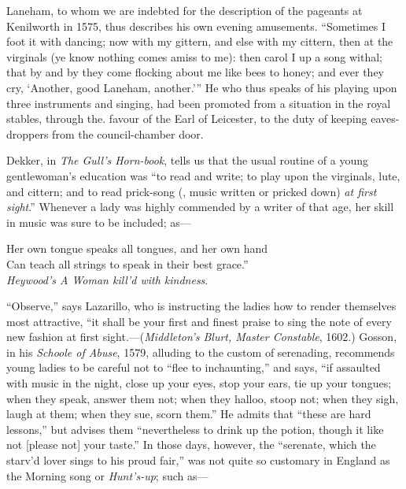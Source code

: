 
Laneham, to whom we are indebted for the description of the pageants at Kenilworth
in 1575, thus describes his own evening amusements. “Sometimes I foot
it with dancing; now with my gittern, and else with my cittern, then at the
virginals (ye know nothing comes amiss to me): then carol I up a song withal;
that by and by they come flocking about me like bees to honey; and ever they
cry, ‘Another, good Laneham, another.’” He who thus speaks of his playing
upon three instruments and singing, had been promoted from a situation in the
royal stables, through the. favour of the Earl of Leicester, to the duty of keeping
eaves-droppers from the council-chamber door.

Dekker, in \textit{The Gull’s Horn-book}, tells us that the usual routine of a young
gentlewoman’s education was “to read and write; to play upon the virginals,
lute, and cittern; and to read prick-song (\ie, music written or pricked down) \textit{at
first sight}.” Whenever a lady was highly commended by a writer of that age,
her skill in music was sure to be included; as—

\settowidth{\versewidth}{Her own tongue speaks all tongues, and her own hand}
\begin{scverse}
Her own tongue speaks all tongues, and her own hand\\
Can teach all strings to speak in their best grace.”\\
\vin\vin\vin\vin\vin\vin \textit{Heywood’s A Woman kill’d with kindness}.
\end{scverse}

“Observe,” says Lazarillo, who is instructing the ladies how to render themselves
most attractive, “it shall be your first and finest praise to sing the note of
every new fashion at first sight.—(\textit{Middleton’s Blurt, Master Constable}, 1602.)
Gosson, in his \textit{Schoole of Abuse}, 1579, alluding to the custom of serenading,
recommends young ladies to be careful not to “flee to inchaunting,” and says, “if
assaulted with music in the night, close up your eyes, stop your ears, tie up your
tongues; when they speak, answer them not; when they halloo, stoop not; when
they sigh, laugh at them; when they sue, scorn them.” He admits that “these are
hard lessons,” but advises them “nevertheless to drink up the potion, though it
like not [please not] your taste.” In those days, however, the “serenate, which
the starv’d lover sings to his proud fair,” was not quite so customary in England
as the Morning song or \textit{Hunt’s-up}; such as—

